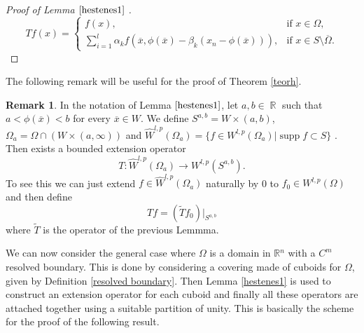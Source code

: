 \documentclass[12pt]{article}
\theoremstyle{definition}
\newtheorem{remark}{Remark}
\DeclareMathOperator\supp{supp}
\DeclareMathOperator\rr{\mathbb{R}}
\begin{document}
\begin{proof}[Proof of Lemma $\ref{hestenes1}$ ]
\[ Tf(x) = \begin{cases}
		f(x), & \text{if } x \in \Omega,\\
		\sum_{i=1}^l \alpha_k f(\overline x, \phi(\overline x)- \beta_k(x_n-\phi(\overline x))), & \text{if } x \in S \setminus \overline \Omega.
\end{cases} 
\]
\end{proof}


The following remark will be useful for the proof of Theorem \ref{teorh}.


\begin{remark}\label{hestenesr}{}
In the notation of Lemma $\ref{hestenes1}$, let $a,b \in \rr$ such that $a<\phi(\overline x) <b$ for every $\overline x \in W$. We define $S^{a,b}=W\times (a,b)$, $\Omega_a=\Omega \cap (W \times (a,\infty))$ and $\widehat W^{l,p}(\Omega_a)=\{f \in W^{l,p}(\Omega_a) | \supp f \subset S\}$ . Then exists a bounded extension operator
\[ T: \widehat W^{l,p}(\Omega_a)\rightarrow W^{l,p}(S^{a,b}).\]
To see this we can just extend $f\in \widehat W^{l,p}(\Omega_a)$ naturally by 0 to  $f_0\in W^{l,p}(\Omega)$ and then define
\[ Tf=(\widetilde T f_0)\big|_{S^{a,b}}\]
where $\widetilde T$ is the operator of the previous Lemmma.
\end{remark}
We can now consider the general case where $\Omega$ is a domain in $\mathbb{R}{}^n$ with a $C^m$ resolved boundary. This is done by considering a covering made of cuboids for $\Omega$, given by Definition \ref{resolved boundary}. Then Lemma \ref{hestenes1} is used to construct an extension operator for each cuboid and finally all these operators are attached together using a suitable partition of unity. This is basically the scheme for the proof of the following result.
\end{document}

